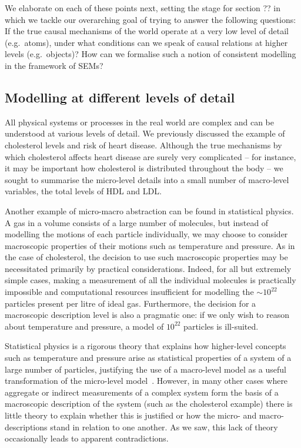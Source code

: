 We elaborate on each of these points next, 
setting the stage for section ?? in which we tackle our overarching goal of trying to answer the following questions:
If the true causal mechanisms of the world operate at a very low level of detail (e.g.~atoms), under what conditions can we speak of causal relations at higher levels (e.g.~objects)?
How can we formalise such a notion of consistent modelling in the framework of SEMs?


\subsection{Modelling at different levels of detail}

All physical systems or processes in the real world are complex and can be understood at various levels of detail.
We previously discussed the example of cholesterol levels and risk of heart disease.
Although the true mechanisms by which cholesterol affects heart disease are surely very complicated -- for instance, it may be important how cholesterol is distributed throughout the body -- we sought to summarise the micro-level details into a small number of macro-level variables, the total levels of HDL and LDL.

Another example of micro-macro abstraction 
can be found in statistical physics.
A gas in a volume consists of a large number of molecules, but instead of modelling the motions of each particle individually, we may choose to consider macroscopic properties of their motions such as temperature and pressure.
As in the case of cholesterol, the decision to use such macroscopic properties may be necessitated primarily by practical considerations.
Indeed, for all but extremely simple cases, making a measurement of all the individual molecules is practically impossible and computational resources insufficient for modelling the ${\sim}10^{22}$ particles present per litre of ideal gas.
Furthermore, the decision for a macroscopic description level is also a pragmatic one: if we only wish to reason about temperature and pressure, a model of $10^{22}$ particles is ill-suited.

Statistical physics is a rigorous theory that explains how higher-level concepts such as temperature and pressure arise as statistical properties of a system of a large number of particles, justifying the use of a macro-level model as a useful transformation of the micro-level model~\citep{Balian}.
However, in many other cases where aggregate or indirect measurements of a complex system form the basis of a macroscopic description of the system (such as the cholesterol example) there is little theory to explain whether this is justified or how the micro- and macro-descriptions stand in relation to one another.
As we saw, this lack of theory occasionally leads to apparent contradictions.

